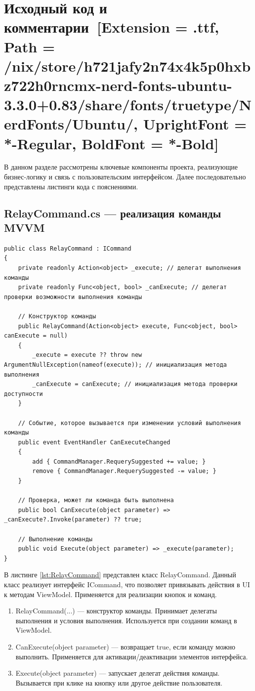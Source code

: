 \documentclass[12pt]{article}
\newcommand{\icon}[1]{\fontspec{UbuntuNerdFont}[Extension = .ttf,
  Path = /nix/store/h721jafy2n74x4k5p0hxbz722h0rncmx-nerd-fonts-ubuntu-3.3.0+0.83/share/fonts/truetype/NerdFonts/Ubuntu/,
  UprightFont = *-Regular,
BoldFont = *-Bold] #1}
\newcommand{\iicon}[1]{{\icon{#1}}}
\renewcommand{\texttt}[1]{{\small\ttfamily #1}}
\newenvironment{code}{\captionsetup{type=listing}}{}
\numberwithin{listing}{section}
\numberwithin{figure}{section}
\begin{document}
\pagebreak

\noindent \section{Исходный код и комментарии~\texorpdfstring{\iicon{}}{}}
В данном разделе рассмотрены ключевые компоненты проекта, реализующие бизнес-логику и связь с пользовательским интерфейсом. Далее последовательно представлены листинги кода с пояснениями.

\subsection{\texttt{RelayCommand.cs} — реализация команды MVVM}
\begin{code}
	\begin{verbatim}
public class RelayCommand : ICommand
{
    private readonly Action<object> _execute; // делегат выполнения команды
    private readonly Func<object, bool> _canExecute; // делегат проверки возможности выполнения команды

    // Конструктор команды
    public RelayCommand(Action<object> execute, Func<object, bool> canExecute = null)
    {
        _execute = execute ?? throw new ArgumentNullException(nameof(execute)); // инициализация метода выполнения
        _canExecute = canExecute; // инициализация метода проверки доступности
    }

    // Событие, которое вызывается при изменении условий выполнения команды
    public event EventHandler CanExecuteChanged
    {
        add { CommandManager.RequerySuggested += value; }
        remove { CommandManager.RequerySuggested -= value; }
    }

    // Проверка, может ли команда быть выполнена
    public bool CanExecute(object parameter) => _canExecute?.Invoke(parameter) ?? true;

    // Выполнение команды
    public void Execute(object parameter) => _execute(parameter);
}
    \end{verbatim}
	\label{lst:RelayCommand}
\end{code}
В листинге \ref{lst:RelayCommand} представлен класс \texttt{RelayCommand}. Данный класс реализует интерфейс \texttt{ICommand}, что позволяет привязывать действия в UI к методам ViewModel. Применяется для реализации кнопок и команд.

\begin{enumerate}
	\item \texttt{RelayCommand(...)} — конструктор команды. Принимает делегаты выполнения и условия выполнения. Используется при создании команд в ViewModel.
	\item \texttt{CanExecute(object parameter)} — возвращает true, если команду можно выполнить. Применяется для активации/деактивации элементов интерфейса.
	\item \texttt{Execute(object parameter)} — запускает делегат действия команды. Вызывается при клике на кнопку или другое действие пользователя.
\end{enumerate}
\end{document}
